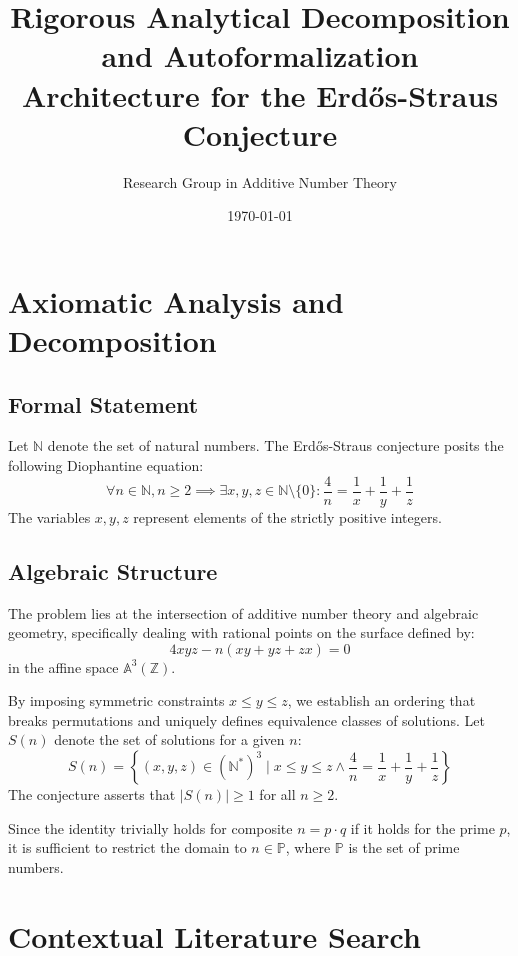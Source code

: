 \documentclass[12pt, a4paper]{article}
\title{Rigorous Analytical Decomposition and Autoformalization Architecture for the Erd\H{o}s-Straus Conjecture}
\author{Research Group in Additive Number Theory}
\date{\today}
\begin{document}
\maketitle
\tableofcontents
\newpage

\section{Axiomatic Analysis and Decomposition}

\subsection{Formal Statement}
Let $\mathbb{N}$ denote the set of natural numbers. The Erd\H{o}s-Straus conjecture posits the following Diophantine equation:
\begin{equation}
\forall n \in \mathbb{N}, n \ge 2 \implies \exists x, y, z \in \mathbb{N} \setminus \{0\} : \frac{4}{n} = \frac{1}{x} + \frac{1}{y} + \frac{1}{z}
\end{equation}
The variables $x, y, z$ represent elements of the strictly positive integers.

\subsection{Algebraic Structure}
The problem lies at the intersection of additive number theory and algebraic geometry, specifically dealing with rational points on the surface defined by:
\begin{equation}
4xyz - n(xy + yz + zx) = 0
\end{equation}
in the affine space $\mathbb{A}^3(\mathbb{Z})$.

By imposing symmetric constraints $x \le y \le z$, we establish an ordering that breaks permutations and uniquely defines equivalence classes of solutions. Let $S(n)$ denote the set of solutions for a given $n$:
\begin{equation}
S(n) = \left\{ (x,y,z) \in (\mathbb{N}^*)^3 \mid x \le y \le z \land \frac{4}{n} = \frac{1}{x} + \frac{1}{y} + \frac{1}{z} \right\}
\end{equation}
The conjecture asserts that $|S(n)| \ge 1$ for all $n \ge 2$.

Since the identity trivially holds for composite $n = p \cdot q$ if it holds for the prime $p$, it is sufficient to restrict the domain to $n \in \mathbb{P}$, where $\mathbb{P}$ is the set of prime numbers.

\newpage
\section{Contextual Literature Search}
\end{document}
